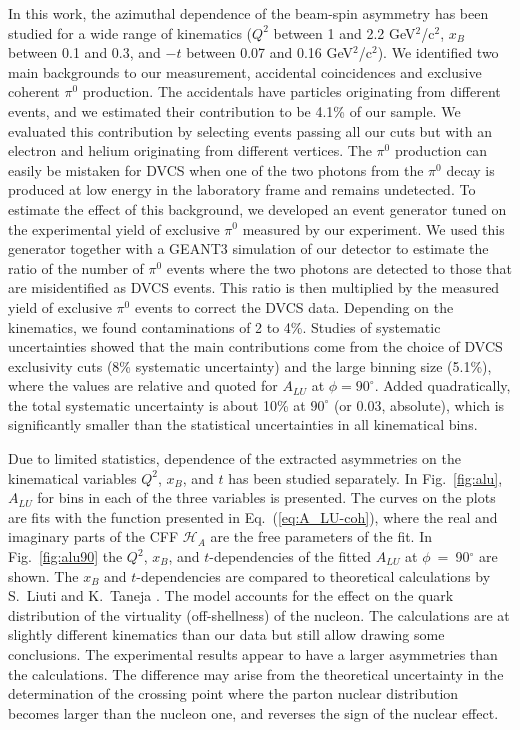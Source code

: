 \documentclass[twocolumn,nofootinbib,showpacs,prl,superscriptaddress,secnumarabic,amssymb,nobibnotes,aps,floatfix]{revtex4}
\begin{document}
In this work, the azimuthal dependence of the beam-spin asymmetry has been studied 
for a wide range of kinematics ($Q^2$ between 1 and 2.2 GeV$^2$/c$^2$, $x_B$ between
0.1 and 0.3, and $-t$ between 0.07 and 0.16 GeV$^2$/c$^2$). We identified two main
backgrounds to our measurement, accidental coincidences and exclusive coherent
$\pi^0$ production.  The accidentals have particles originating from different events,
and we estimated their contribution to be 4.1\% of our sample. We evaluated this 
contribution by selecting events passing all our cuts but with an electron and 
helium originating from different vertices. The $\pi^0$ production can easily
be mistaken for DVCS when one of the two photons from the $\pi^0$ 
decay is produced at low energy in the laboratory frame and remains undetected.  
To estimate the effect of this background, we developed an event generator 
tuned on the experimental yield of exclusive $\pi^0$ measured by our 
experiment. We used this generator together with a GEANT3 simulation of our 
detector to estimate the ratio of the number of $\pi^0$ events where the 
two photons are detected to those that are misidentified as DVCS events. This 
ratio is then multiplied by the measured yield of exclusive $\pi^0$ events to 
correct the DVCS data.  Depending on the kinematics, we found contaminations of 
2 to 4\%. Studies of systematic uncertainties showed that the main contributions 
come from the choice of DVCS exclusivity cuts (8\% systematic uncertainty) and the 
large binning size (5.1\%), where the values are relative and quoted for $A_{LU}$
at $\phi=90^\circ$.  Added quadratically, the total systematic uncertainty
is about 10\% at $90^\circ$ (or 0.03, absolute), which is significantly smaller
than the statistical uncertainties in all kinematical bins. 

Due to limited statistics, dependence of the extracted asymmetries on the kinematical variables $Q^2$, 
$x_B$, and $t$ has been studied separately. In Fig.~\ref{fig:alu}, $A_{LU}$ for 
bins in each of the three variables is presented. The curves on the plots are fits with 
the function presented in Eq.~(\ref{eq:A_LU-coh}), where the real and imaginary 
parts of the CFF $\mathcal{H}_{A}$ are the free parameters of the fit.  In 
Fig.~\ref{fig:alu90} the $Q^2$, $x_{B}$, and $t$-dependencies of the fitted 
$A_{LU}$ at $\phi$~=~90$^{\circ}$ are shown. The $x_{B}$ and $t$-dependencies 
are compared to theoretical calculations by S.~Liuti and K.~Taneja 
\cite{simonetta_2}. The model accounts for the effect on the quark 
distribution of the virtuality (off-shellness) of the nucleon. The calculations are at slightly 
different kinematics than our data but still allow drawing some conclusions. The 
experimental results appear to have a larger asymmetries than the calculations. 
The difference may arise from the theoretical uncertainty in the determination 
of the crossing point where the parton nuclear distribution becomes larger than the 
nucleon one, and reverses the sign of the nuclear effect.
\end{document}
